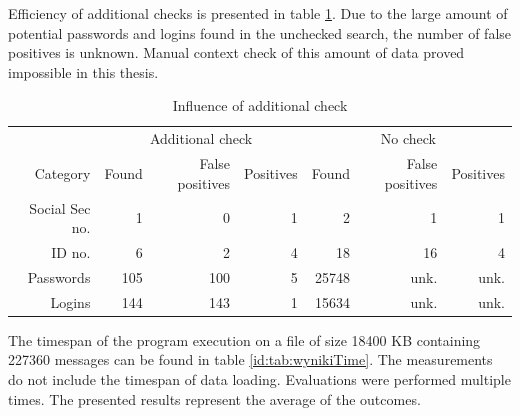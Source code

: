 \documentclass[a4paper,twoside,12pt]{book}
\begin{document}
Efficiency of additional checks is presented in table \ref{id:tab:wynikiNoCheck}. Due to the large amount of potential passwords and logins
found in the unchecked search, the number of false positives is unknown. Manual context check of this amount of data proved impossible in this 
thesis.

\begin{table}
   \centering
   \caption{Influence of additional check}
   \label{id:tab:wynikiNoCheck}
   \begin{tabular}{rrrrrrr}
   \toprule
                     &           \multicolumn{3}{c}{Additional check}    &    \multicolumn{3}{c}{No check}\\
                                 \cmidrule(r){2-4}                            \cmidrule(r){5-7}
      Category       &   Found &   False positives & Positives &   Found &   False positives & Positives \\
      Social Sec no. &       1 &                 0 &         1 &       2 &                 1 &         1 \\
      ID no.         &       6 &                 2 &         4 &      18 &                16 &         4 \\
      Passwords      &     105 &               100 &         5 &   25748 &              unk. &      unk. \\
      Logins         &     144 &               143 &         1 &   15634 &              unk. &      unk. \\
   \bottomrule
   \end{tabular}
   \end{table} 


The timespan of the program execution on a file of size 18400 KB containing 227360 messages can be found in table \ref{id:tab:wynikiTime}. 
The measurements do not include the timespan of data loading. Evaluations were performed multiple times. The presented results
represent the average of the outcomes.
\end{document}

